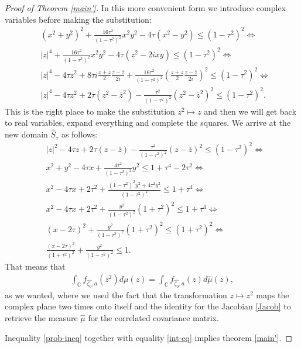 \documentclass[10pt,a4paper]{amsart}
\begin{document}
\begin{proof}[Proof of Theorem \ref{main'}]
In this more convenient form we introduce complex variables before making the substitution:
\begin{align*}
    &(x^2+y^2)^2 + \frac{16\tau^2}{(1-\tau^2)^2}x^2y^2 - 4\tau (x^2-y^2) \leq (1-\tau^2)^2 \Leftrightarrow \\
    &|z|^4 + \frac{16\tau^2}{(1-\tau^2)^2}x^2y^2 - 4\tau (z^2 - 2ixy) \leq (1-\tau^2)^2 \Leftrightarrow \\
    &|z|^4 - 4\tau z^2 + 8\tau i \frac{z+\overline{z}}{2}\frac{z-\overline{z}}{2i} + \frac{16\tau^2}{(1-\tau^2)^2} \left ( \frac{z+\overline{z}}{2}\frac{z-\overline{z}}{2i} \right )^2 \leq (1-\tau^2)^2 \Leftrightarrow \\
    &|z|^4 -4\tau z^2 + 2\tau (z^2 - \overline{z}^2) - \frac{\tau^2}{(1-\tau^2)^2} (z^2 - \overline{z}^2)^2 \leq (1-\tau^2)^2 .
\end{align*}
This is the right place to make the substitution $z^2 \mapsto z$ and then we will get back to real variables, expand everything and complete the squares. We arrive at the new domain $\widehat{S}_{\tau}$ as follows:
%
\begin{align*}
    &|z|^2 - 4\tau z + 2\tau (z-\overline{z}) - \frac{\tau^2}{(1-\tau^2)^2} (z - \overline{z})^2 \leq (1-\tau^2)^2 \Leftrightarrow \\
    &x^2+y^2 - 4\tau x + \frac{4\tau^2}{(1-\tau^2)^2} y^2 \leq 1 + \tau^4 - 2\tau^2 \Leftrightarrow \\
    &x^2 - 4\tau x + 2\tau^2 + \frac{(1-\tau^2)^2y^2 + 4\tau^2y^2}{(1-\tau^2)^2} \leq 1 + \tau^4 \Leftrightarrow \\
    &x^2 - 4\tau x + 2\tau^2 + \frac{y^2}{(1-\tau^2)^2}(1+\tau^2)^2 \leq 1 + \tau^4 \Leftrightarrow \\
    &(x- 2\tau)^2 + \frac{y^2}{(1-\tau^2)^2}(1+\tau^2)^2 \leq (1+\tau^2)^2 \Leftrightarrow \\
    &\frac{(x-2\tau)^2}{(1+\tau^2)^2} + \frac{y^2}{(1-\tau^2)^2} \leq 1 .
\end{align*}
%
That means that
\begin{align} \label{int-eq}
\int_{\mathbb{C}} f_{\widehat{\zeta_0},a}(z^2) d \mu (z) = \int_{{\mathbb{C}}} f_{\widehat{\zeta_0},a}(z) d \widehat{\mu} (z),
\end{align}
as we wanted, where we used the fact that the transformation $z \mapsto z^2$ maps the complex plane two times onto itself and the identity for the Jacobian \eqref{Jacob} to retrieve the measure $\widehat{\mu}$ for the correlated covariance matrix.

Inequality \ref{prob-ineq} together with equality \ref{int-eq} implies theorem \ref{main'}.
%
\end{proof}
\end{document}
